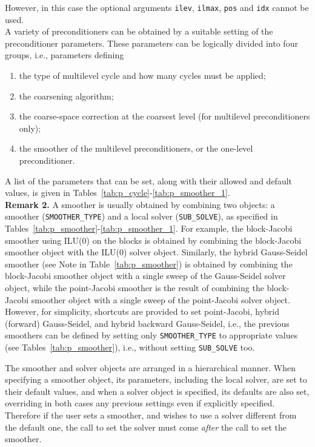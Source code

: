 \noindent
However, in this case the optional arguments \verb|ilev|,
\verb|ilmax|, \verb|pos| and \verb|idx|
cannot be used. \\

A variety of preconditioners can be obtained
by a suitable setting of the preconditioner parameters. These parameters
can be logically divided into four groups, i.e., parameters defining
\begin{enumerate}
	\item the type of multilevel cycle and how many cycles must be applied;
        \item the coarsening algorithm;
        \item the coarse-space correction at the coarsest level (for multilevel
                 preconditioners only);
	\item the smoother of the multilevel preconditioners, or the one-level
                  preconditioner.
	
\end{enumerate}
A list of the parameters that can be set, along with their allowed and
default values, is given in Tables~\ref{tab:p_cycle}-\ref{tab:p_smoother_1}.\\

\textbf{Remark 2.} A smoother is usually obtained by combining two objects:
a smoother (\verb|SMOOTHER_TYPE|) and a local solver (\verb|SUB_SOLVE|),
as specified in Tables~\ref{tab:p_smoother}-\ref{tab:p_smoother_1}.
For example, the block-Jacobi smoother using
ILU(0) on the blocks is obtained by combining the block-Jacobi smoother
object with the ILU(0) solver object. Similarly,
the hybrid Gauss-Seidel smoother (see Note in Table~\ref{tab:p_smoother})
is obtained by combining the block-Jacobi smoother object with a single sweep
of the Gauss-Seidel solver object, while the point-Jacobi smoother is the
result of combining the block-Jacobi smoother object with a single sweep
of the point-Jacobi solver object. However, for simplicity, shortcuts are
provided to set point-Jacobi, hybrid (forward) Gauss-Seidel, and
hybrid backward Gauss-Seidel, i.e., the previous smoothers can be defined
by setting only \verb|SMOOTHER_TYPE| to appropriate values (see
Tables~\ref{tab:p_smoother}), i.e., without setting
\verb|SUB_SOLVE| too.

The smoother and solver objects are arranged in a
hierarchical manner. When specifying a smoother object, its parameters,
including the local solver, are set to their default values, and when a solver
object is specified, its defaults are also set, overriding in both
cases any previous settings even if explicitly specified. Therefore if
the user sets a smoother, and wishes to use a solver
different from  the default one, the call to set the solver must come
\emph{after} the call to set the smoother.

